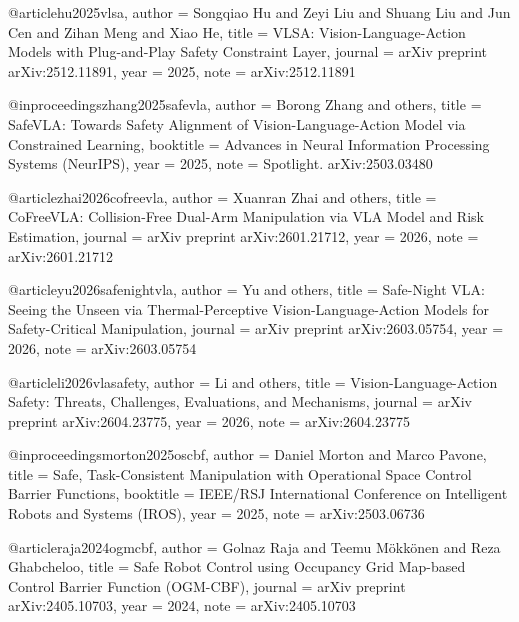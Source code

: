 

@article{hu2025vlsa,
  author    = {Songqiao Hu and Zeyi Liu and Shuang Liu and Jun Cen and Zihan Meng and Xiao He},
  title     = {{VLSA}: Vision-Language-Action Models with Plug-and-Play Safety Constraint Layer},
  journal   = {arXiv preprint arXiv:2512.11891},
  year      = {2025},
  note      = {arXiv:2512.11891}
}

@inproceedings{zhang2025safevla,
  author    = {Borong Zhang and others},
  title     = {{SafeVLA}: Towards Safety Alignment of Vision-Language-Action Model via Constrained Learning},
  booktitle = {Advances in Neural Information Processing Systems (NeurIPS)},
  year      = {2025},
  note      = {Spotlight. arXiv:2503.03480}
}

@article{zhai2026cofreevla,
  author    = {Xuanran Zhai and others},
  title     = {{CoFreeVLA}: Collision-Free Dual-Arm Manipulation via {VLA} Model and Risk Estimation},
  journal   = {arXiv preprint arXiv:2601.21712},
  year      = {2026},
  note      = {arXiv:2601.21712}
}

@article{yu2026safenightvla,
  author    = {Yu and others},
  title     = {{Safe-Night VLA}: Seeing the Unseen via Thermal-Perceptive Vision-Language-Action Models for Safety-Critical Manipulation},
  journal   = {arXiv preprint arXiv:2603.05754},
  year      = {2026},
  note      = {arXiv:2603.05754}
}

@article{li2026vlasafety,
  author    = {Li and others},
  title     = {Vision-Language-Action Safety: Threats, Challenges, Evaluations, and Mechanisms},
  journal   = {arXiv preprint arXiv:2604.23775},
  year      = {2026},
  note      = {arXiv:2604.23775}
}


@inproceedings{morton2025oscbf,
  author    = {Daniel Morton and Marco Pavone},
  title     = {Safe, Task-Consistent Manipulation with Operational Space Control Barrier Functions},
  booktitle = {IEEE/RSJ International Conference on Intelligent Robots and Systems (IROS)},
  year      = {2025},
  note      = {arXiv:2503.06736}
}

@article{raja2024ogmcbf,
  author    = {Golnaz Raja and Teemu M{\"o}kk{\"o}nen and Reza Ghabcheloo},
  title     = {Safe Robot Control using Occupancy Grid Map-based Control Barrier Function ({OGM-CBF})},
  journal   = {arXiv preprint arXiv:2405.10703},
  year      = {2024},
  note      = {arXiv:2405.10703}
}

